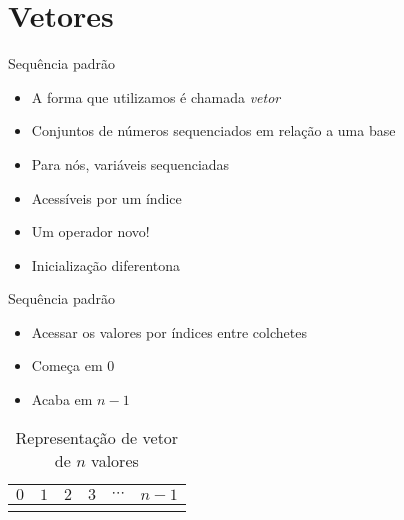 \documentclass[14pt]{beamer}
\begin{document}
	\section{Vetores}
		\begin{frame}{Sequência padrão}
			\begin{itemize}
				\presentationPause\item A forma que utilizamos é chamada \emph{vetor}
				\presentationPause\item Conjuntos de números sequenciados em relação a uma base
				\presentationPause\item Para nós, variáveis sequenciadas
				\presentationPause\item Acessíveis por um índice
				\presentationPause\item Um operador novo! \presentationPause\basicCode{[]}
				\presentationPause
				\presentationPause\item Inicialização diferentona
				\presentationPause
			\end{itemize}
		\end{frame}
	
		\begin{frame}{Sequência padrão}
			\begin{itemize}
				\presentationPause\item Acessar os valores por índices entre colchetes \basicCode{[i]}
				\presentationPause\item Começa em $0$
				\presentationPause\item Acaba em $n-1$
			\end{itemize}
			\presentationPause\begin{table}[H]
				\centering
				\caption{Representação de vetor de $n$ valores}
				\label{table.array}
				\begin{tabular}{cccccc}
					$0$                      & $1$                     & $2$                     & $3$                     & $\cdots$                & $n-1$                     \\ \hline
					\multicolumn{1}{|l|}{} & \multicolumn{1}{l|}{} & \multicolumn{1}{l|}{} & \multicolumn{1}{l|}{} & \multicolumn{1}{l|}{} & \multicolumn{1}{l|}{} \\ \hline
					\end{tabular}
				\end{table}
			\presentationPause
		\end{frame}
\end{document}
